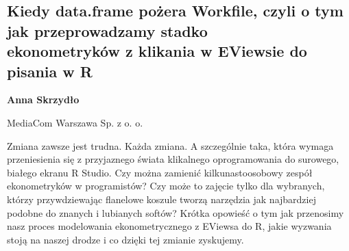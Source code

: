 \documentclass[\main/boa.tex]{subfiles}
\begin{document}
\subsection[Kiedy data.frame pożera Workfile, czyli o tym jak przeprowadzamy stadko \\ ekonometryków z klikania w EViewsie do pisania w R]{Kiedy data.frame pożera Workfile, czyli o tym jak przeprowadzamy stadko \\ ekonometryków z klikania w EViewsie do pisania w R}

\begin{minipage}{0.915\textwidth}
	\centering
  {\bf {}Anna Skrzydło}
\end{minipage}


\begin{affiliations}
\begin{minipage}{0.915\textwidth}
\centering
MediaCom Warszawa Sp. z o. o. \\[-2pt]
\end{minipage}
\end{affiliations}

\vskip 0.3cm

Zmiana zawsze jest trudna. Każda zmiana. A szczególnie taka, która wymaga przeniesienia się z przyjaznego świata klikalnego oprogramowania do surowego, białego ekranu R Studio. Czy można zamienić kilkunastoosobowy zespół ekonometryków w programistów? Czy może to zajęcie tylko dla wybranych, którzy przywdziewając flanelowe koszule tworzą narzędzia jak najbardziej podobne do znanych i lubianych softów? Krótka opowieść o tym jak przenosimy nasz proces modelowania ekonometrycznego z EViewsa do R, jakie wyzwania stoją na naszej drodze i co dzięki tej zmianie zyskujemy. 
\end{document}
